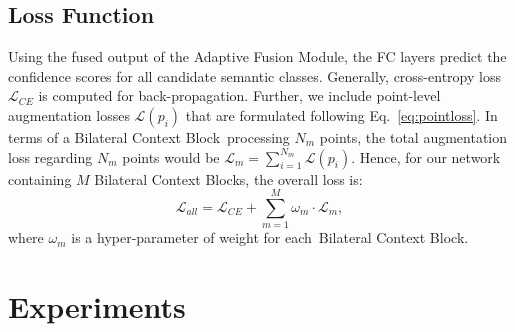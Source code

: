 \documentclass[10pt,twocolumn,letterpaper]{article}
\def\ourblock{Bilateral Context Block}
\def\ourblocks{Bilateral Context Blocks}
\def\ourdecoder{Adaptive Fusion Module}
\begin{document}
\subsection{Loss Function}
Using the fused output of the \ourdecoder, the FC layers predict the confidence scores for all candidate semantic classes. Generally, cross-entropy loss $\mathcal{L}_{CE}$ is computed for back-propagation. Further, we include point-level augmentation losses $\mathcal{L}(p_i)$ that are formulated following Eq.~\ref{eq:pointloss}. In terms of a \ourblock~processing $N_m$ points, the total augmentation loss regarding $N_m$ points would be $\mathcal{L}_{m}=\sum_{i=1}^{N_m} \mathcal{L}(p_i)$. Hence, for our network containing $M$ \ourblocks, the overall loss is:
\begin{equation}
\label{equ:all_loss}
    \mathcal{L}_{all} = \mathcal{L}_{CE} + \sum_{m=1}^{M} \omega_m \cdot \mathcal{L}_{m},
\end{equation}
where $\omega_m$ is a hyper-parameter of weight for each~\ourblock.
%
 \section{Experiments}
\label{sec:exp}
\end{document}
